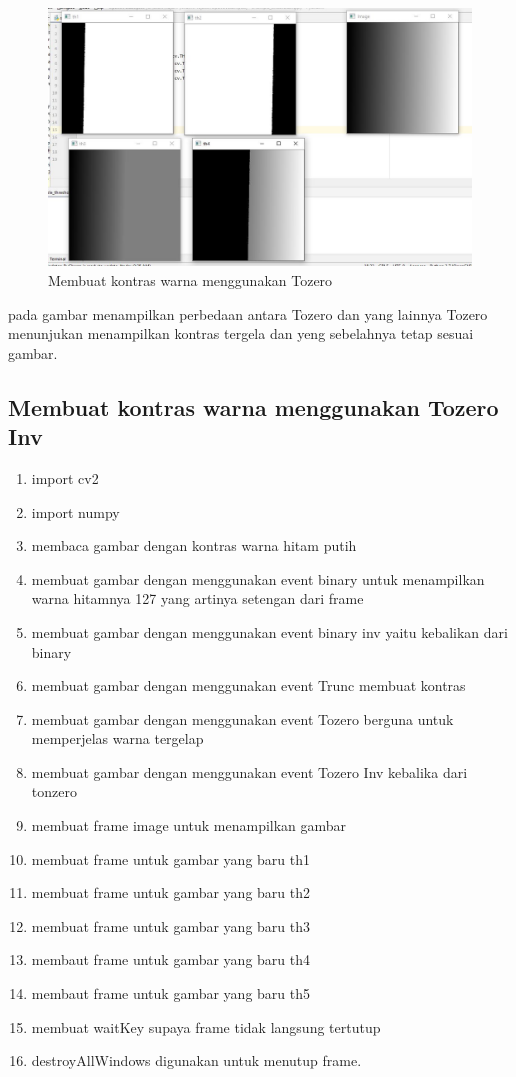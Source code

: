 \newpage
\begin{figure}[ht]
\centering
\includegraphics[scale=0.5]{figures/2,41.jpg}
\caption{Membuat kontras warna menggunakan Tozero}
\label{contoh}
\end{figure}
pada gambar menampilkan perbedaan antara Tozero dan yang lainnya Tozero menunjukan menampilkan kontras tergela dan yeng sebelahnya tetap sesuai gambar.



\newpage
\subsection{Membuat kontras warna menggunakan Tozero Inv}

\begin{enumerate}
	\item import cv2
	\item import numpy
	\item membaca gambar dengan kontras warna hitam putih
	\item membuat gambar dengan menggunakan event binary untuk menampilkan warna hitamnya 127 yang artinya setengan dari frame
	\item membuat gambar dengan menggunakan event binary inv yaitu kebalikan dari binary
	\item membuat gambar dengan menggunakan event Trunc membuat kontras 
	\item membuat gambar dengan menggunakan event Tozero berguna untuk memperjelas warna tergelap
	\item membuat gambar dengan menggunakan event Tozero Inv kebalika dari tonzero
	\item membuat frame image untuk menampilkan gambar
	\item membuat frame untuk gambar yang baru th1
	\item membuat frame untuk gambar yang baru th2
	\item membuat frame untuk gambar yang baru th3
	\item membaut frame untuk gambar yang baru th4
	\item membaut frame untuk gambar yang baru th5
	\item membuat waitKey supaya frame tidak langsung tertutup
	\item destroyAllWindows digunakan untuk menutup frame.
\end{enumerate}

